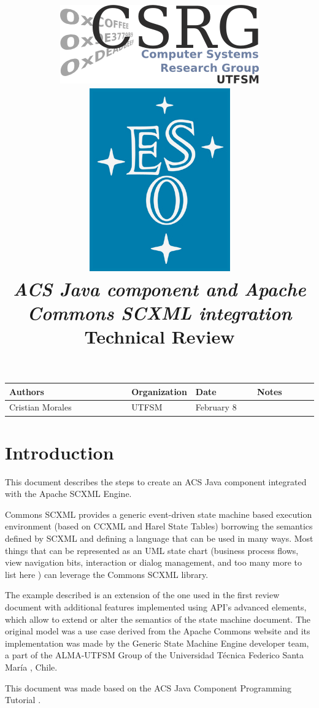 \documentclass[]{article}
\title{
   \includegraphics[width=0.30\linewidth,height=!]{img/csrg}
   \hfill
   \includegraphics[width=0.2\linewidth,height=!]{img/eso-logo}\\
	\vspace{2cm}
   \emph{ACS Java component and Apache Commons SCXML integration} \\
   \vspace{1cm}Technical Review
}
\date{}
\begin{document}
\maketitle
\thispagestyle{empty}

\hspace{-3.3cm}
\hfill
\begin{tabular}{|p{0.4\linewidth}|p{0.20\linewidth}|p{0.20\linewidth}|p{0.35\linewidth}|} \hline
\textbf{Authors} & \textbf{Organization} & \textbf{Date} &
\textbf{Notes}\\
\hline\hline
Cristian Morales & UTFSM & February 8 \\
\hline
\end{tabular}
\hfill

\clearpage
\cfoot{}
\thispagestyle{fancy}
\cfoot{\thepage}
\setcounter{page}{1}
\tableofcontents
\clearpage

\section{Introduction}

This document describes the steps to create an ACS Java component integrated with the Apache SCXML Engine.

Commons SCXML \cite{Apache} provides a generic event-driven state machine based execution environment (based on CCXML and Harel State Tables) borrowing the semantics defined by SCXML and defining a language that can be used in many ways. Most things that can be represented as an UML state chart (business process flows, view navigation bits, interaction or dialog management, and too many more to list here ) can leverage the Commons SCXML library.

The example described is an extension of the one used in the first review document \cite{GoogleCode} with additional features implemented using API's advanced elements, which allow to extend or alter the semantics of the state machine document. The original model was a use case derived from the Apache Commons website \cite{Apache} and its implementation was made by the Generic State Machine Engine \cite{GSME-UTFSM} developer team, a part of the ALMA-UTFSM Group\cite{ALMA-UTFSM} of the Universidad Técnica Federico Santa María \cite{UTFSM}, Chile.

This document was made based on the ACS Java Component Programming Tutorial \cite{JavaComponentTut}.
\end{document}
